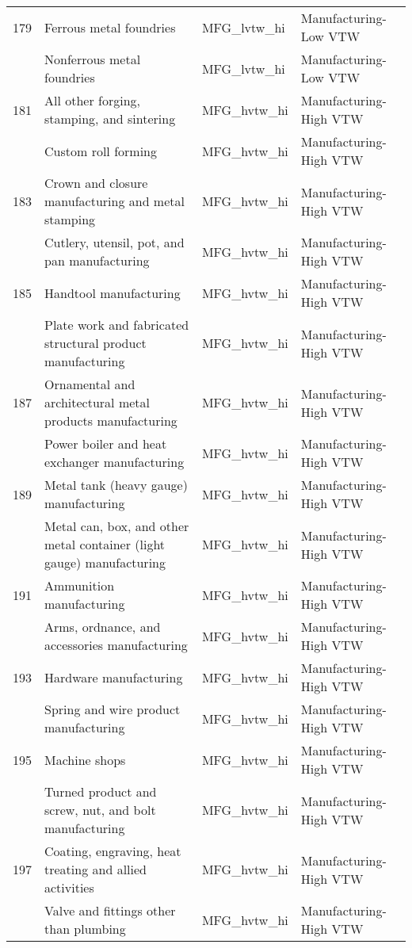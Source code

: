 \begin{landscape}
\begin{small}
\begin{longtable}{clll}
179 & Ferrous metal foundries & MFG\_lvtw\_hi & Manufacturing-Low VTW \\
\gray 180 & Nonferrous metal foundries & MFG\_lvtw\_hi & Manufacturing-Low VTW \\
181 & All other forging, stamping, and sintering & MFG\_hvtw\_hi & Manufacturing-High VTW \\
\gray 182 & Custom roll forming & MFG\_hvtw\_hi & Manufacturing-High VTW \\
183 & Crown and closure manufacturing and metal stamping & MFG\_hvtw\_hi & Manufacturing-High VTW \\
\gray 184 & Cutlery, utensil, pot, and pan manufacturing & MFG\_hvtw\_hi & Manufacturing-High VTW \\
185 & Handtool manufacturing & MFG\_hvtw\_hi & Manufacturing-High VTW \\
\gray 186 & Plate work and fabricated structural product manufacturing & MFG\_hvtw\_hi & Manufacturing-High VTW \\
187 & Ornamental and architectural metal products manufacturing & MFG\_hvtw\_hi & Manufacturing-High VTW \\
\gray 188 & Power boiler and heat exchanger manufacturing & MFG\_hvtw\_hi & Manufacturing-High VTW \\
189 & Metal tank (heavy gauge) manufacturing & MFG\_hvtw\_hi & Manufacturing-High VTW \\
\gray 190 & Metal can, box, and other metal container (light gauge) manufacturing & MFG\_hvtw\_hi & Manufacturing-High VTW \\
191 & Ammunition manufacturing & MFG\_hvtw\_hi & Manufacturing-High VTW \\
\gray 192 & Arms, ordnance, and accessories manufacturing & MFG\_hvtw\_hi & Manufacturing-High VTW \\
193 & Hardware manufacturing & MFG\_hvtw\_hi & Manufacturing-High VTW \\
\gray 194 & Spring and wire product manufacturing & MFG\_hvtw\_hi & Manufacturing-High VTW \\
195 & Machine shops & MFG\_hvtw\_hi & Manufacturing-High VTW \\
\gray 196 & Turned product and screw, nut, and bolt manufacturing & MFG\_hvtw\_hi & Manufacturing-High VTW \\
197 & Coating, engraving, heat treating and allied activities & MFG\_hvtw\_hi & Manufacturing-High VTW \\
\gray 198 & Valve and fittings other than plumbing & MFG\_hvtw\_hi & Manufacturing-High VTW \\

\end{longtable}
\end{small}
\end{landscape}
